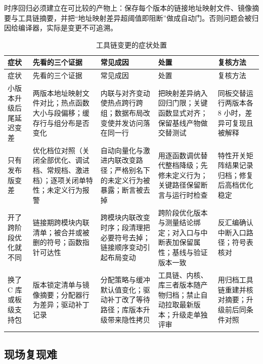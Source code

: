 \documentclass[12pt,a4paper,fontset=fandol]{ctexbook}
\begin{document}
\begin{note}[title={把产物可追溯性当成前置条件}]
时序回归必须建立在可比较的产物上：保存每个版本的链接地址映射文件、镜像摘要与工具链摘要，并把``地址映射差异超阈值即阻断''做成自动门。否则问题会被归因给编译器，实际是变更不可追溯。
\end{note}

\begin{longtable}{>{\raggedright\arraybackslash\footnotesize}p{}>{\raggedright\arraybackslash\footnotesize}p{}>{\raggedright\arraybackslash\footnotesize}p{}>{\raggedright\arraybackslash\footnotesize}p{}>{\raggedright\arraybackslash\footnotesize}p{}}
\caption{工具链变更的症状处置}\label{tab:apC-toolchain} \\
\toprule
症状 & 先看的三个证据 & 常见成因 & 处置 & 复核方法 \\
\midrule
\endfirsthead
\toprule
症状 & 先看的三个证据 & 常见成因 & 处置 & 复核方法 \\
\midrule
\endhead
\bottomrule
\endfoot
\endlastfoot
小版本升级后尾延迟变差 & 两版本地址映射文件对比；热点函数大小与段偏移；缓存行与组分布是否变化 & 内联与对齐变动使热点跨行跨组；数据布局改变使并发访问落在同一行 & 把映射差异纳入回归门限；关键函数显式对齐；保留基线产物做交替测试 & 同板交替运行两版本各 8 小时，差异可复现且被解释 \\
只有发布版变差 & 优化档位对照（关闭全部优化、调试档、常规档、激进档）；逐项关闭单特性；未定义行为报警 & 自动向量化与激进内联改变路径；严格别名下的未定义行为被暴露；断言被去掉 & 用逐函数调优替代整档降级；先修未定义行为；关键路径保留断言与运行时检查 & 特性开关矩阵结果记录归档；修复后高档优化稳定 \\
开了跨阶段优化就不同 & 链接期跨模块内联清单；被合并或被删的符号；函数指针可达性 & 跨模块内联改变时序；段清理把必要符号去掉；链接顺序变动引起布局变动 & 跨阶段优化版本与测量结论绑定；对入口与中断表加保留属性；基线与验证版本一致 & 反汇编确认中断入口路径；符号表核对 \\
换了 C 库或板级支持包 & 版本锁定清单与镜像摘要；分配器行为差异；驱动补丁记录 & 分配策略与缓冲默认值变化；驱动补丁改了等待路径；库版本升级带来隐性拷贝 & 工具链、内核、库三者版本随产物归档；禁止自动拉取最新版本；升级走单独评审 & 用归档工具链重建并核对摘要；升级前后同条件对照 \\
\end{longtable}

\subsection{现场复现难}
\end{document}

